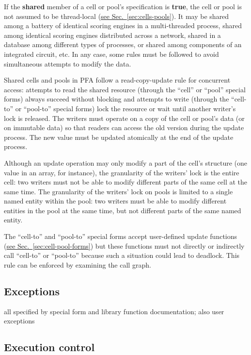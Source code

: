 \documentclass{article}
\newcommand{\PFAc}{\ttfamily\bfseries}
\theoremstyle{definition}
\begin{document}
If the {\PFAc shared} member of a cell or pool's specification is {\PFAc true}, the cell or pool is not assumed to be thread-local (\hyperlink{hsec:cells-pools}{see Sec.~\ref{sec:cells-pools}}).  It may be shared among a battery of identical scoring engines in a multi-threaded process, shared among identical scoring engines distributed across a network, shared in a database among different types of processes, or shared among components of an integrated circuit, etc.  In any case, some rules must be followed to avoid simultaneous attempts to modify the data.

Shared cells and pools in PFA follow a read-copy-update rule for concurrent access: attempts to read the shared resource (through the ``cell'' or ``pool'' special forms) always succeed without blocking and attempts to write (through the ``cell-to'' or ``pool-to'' special forms) lock the resource or wait until another writer's lock is released.  The writers must operate on a copy of the cell or pool's data (or on immutable data) so that readers can access the old version during the update process.  The new value must be updated atomically at the end of the update process.

Although an update operation may only modify a part of the cell's structure (one value in an array, for instance), the granularity of the writers' lock is the entire cell: two writers must not be able to modify different parts of the same cell at the same time.  The granularity of the writers' lock on pools is limited to a single named entity within the pool: two writers must be able to modify different entities in the pool at the same time, but not different parts of the same named entity.

The ``cell-to'' and ``pool-to'' special forms accept user-defined update functions (\hyperlink{hsec:cell-pool-forms}{see Sec.~\ref{sec:cell-pool-forms}}) but these functions must not directly or indirectly call ``cell-to'' or ``pool-to'' because such a situation could lead to deadlock.  This rule can be enforced by examining the call graph.

\hypertarget{hsec:exceptions}{}
\subsection{Exceptions}
\label{sec:exceptions}

all specified by special form and library function documentation; also user exceptions

\hypertarget{hsec:control}{}
\subsection{Execution control}
\label{sec:control}
\end{document}
